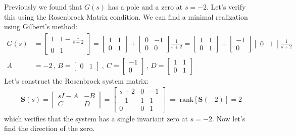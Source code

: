 \documentclass[twoside]{article}
\begin{document}
Previously we found that $G(s)$ has a pole and a zero at $s = -2$. Let's verify this using the Rosenbrock Matrix condition. We can find a minimal realization using Gilbert's method:
\begin{align*}
     G(s) &= \begin{bmatrix} 1 & 1 - \frac{1}{s+2}  \\  
	0 & 1  \end{bmatrix}
	= \begin{bmatrix} 1 & 1   \\  
	0 & 1  \end{bmatrix} +  \begin{bmatrix} 0 & -1 \\  
	0 & 0  \end{bmatrix} \frac{1}{s+2}
	= \begin{bmatrix} 1 & 1   \\  
	0 & 1  \end{bmatrix} +  \begin{bmatrix} -1 \\ 0 \end{bmatrix}   
       \begin{bmatrix} 0 & 1 \end{bmatrix}    \frac{1}{s+2}
       \\
       A &= -2 \, , \, B = \begin{bmatrix} 0 & 1 \end{bmatrix} \ , \ C = \begin{bmatrix} -1 \\ 0 \end{bmatrix}
       \, , \, D = \begin{bmatrix} 1 & 1   \\  
	0 & 1  \end{bmatrix}
\end{align*}
%
Let's construct the Rosenbrock system matrix: 
%
\begin{align*}
\mathbf{S}(s) = \left[ \begin{array}{c|c} s I - A & -B \\ \hline C & D \end{array} \right]
= \left[ \begin{array}{c|cc} s + 2 & 0 & - 1 \\ \hline -1 & 1 & 1 \\ 0 & 0 & 1 \end{array} \right]
\, \Rightarrow \, \mathrm{rank}[\mathbf{S}(-2)] = 2 
\end{align*}
%
which verifies that the system has a single invariant zero at $s = -2$. Now let's find the direction of the zero. 
\end{document}
